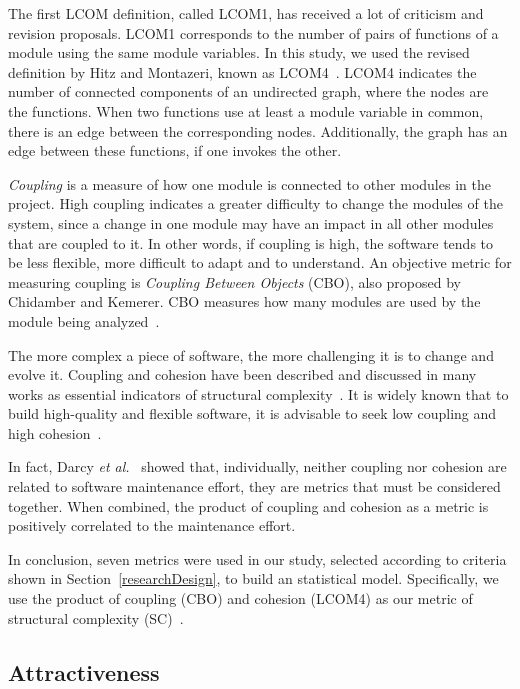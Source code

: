 \documentclass[conference]{IEEEtran}
\begin{document}
The first LCOM definition, called LCOM1, has
received a lot of criticism and revision proposals. LCOM1 corresponds to
the number of pairs of functions of a module using the same module variables.
%
In this study, we used the revised definition by Hitz and Montazeri,
known as LCOM4~\cite{LCOM4}.
%
LCOM4 indicates the number of connected components of an undirected graph, where the
nodes are the functions. When two functions use at least a module variable in
common, there is an edge between the corresponding nodes. Additionally, the graph
has an edge between these functions, if one invokes the other.

\emph{Coupling} is a measure of how one module is connected to other modules
in the project.
%
High coupling indicates a greater difficulty to change the
modules of the system, since a change in one module may have an impact in
all other modules that are coupled to it.
%
In other words, if coupling is high, the software tends to be less flexible,
more difficult to adapt and to understand.
%
An objective metric for measuring coupling is \emph{Coupling Between Objects} (CBO),
also proposed by Chidamber and Kemerer. CBO measures how many modules are
used by the module being analyzed~\cite{Chidamber94}.

The more complex a piece of software, the more challenging it is to change and
evolve it. Coupling and cohesion have been described and discussed in
many works as essential indicators of structural complexity~\cite{darcy2005}.
%
It is widely known that to build high-quality and flexible software, 
it is advisable to seek low coupling and high cohesion~\cite{richter99}.

In fact, Darcy \emph{et al.}~\cite{darcy2005} showed that, individually, neither
coupling nor cohesion are related to software maintenance effort,
they are metrics that must be considered together. When combined, the
product of coupling and cohesion as a metric is positively correlated to
the maintenance effort.

In conclusion, seven metrics were used in our study, selected according to 
criteria shown in Section~\ref{researchDesign}, to build an statistical model.
%
Specifically, we use the product of coupling (CBO) and cohesion (LCOM4) as
our metric of structural complexity (SC)~\cite{darcy2005}.

\subsection{Attractiveness} 
\label{attract}
\end{document}
